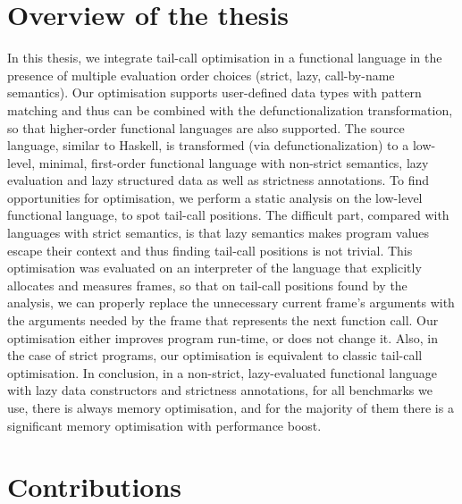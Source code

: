 \documentclass[diploma]{softlab-thesis}
\begin{document}
\section {Overview of the thesis}

In this thesis, we integrate tail-call optimisation in a functional 
language in the presence of multiple evaluation order choices (strict, lazy, call-by-name semantics). 
Our optimisation supports user-defined data types with pattern matching and thus can be combined with the
defunctionalization transformation, so that higher-order functional languages are also supported. The source language, similar to Haskell, 
is transformed (via defunctionalization) to a low-level, minimal, first-order functional language 
with non-strict semantics, lazy evaluation and lazy structured data as well as strictness 
annotations. To find opportunities for optimisation, we perform a static analysis on the 
low-level functional language, to spot tail-call positions. The difficult part, 
compared with languages with strict semantics, is that lazy semantics makes program values escape 
their context and thus finding tail-call positions is not trivial. This optimisation was evaluated
on an interpreter of the language that explicitly allocates and measures frames, so that on 
tail-call positions found by the analysis, we can properly replace the unnecessary current 
frame's arguments with the arguments needed by the frame that represents the next function call. 
Our optimisation either improves program run-time, or does not change it. Also, in the case of 
strict programs, our optimisation is equivalent to classic tail-call optimisation. In conclusion,
in a non-strict, lazy-evaluated functional language with lazy data constructors and strictness 
annotations, for all benchmarks we use, there is always memory optimisation, and for the majority 
of them there is a significant memory optimisation with performance boost.

\section{Contributions}
\end{document}
